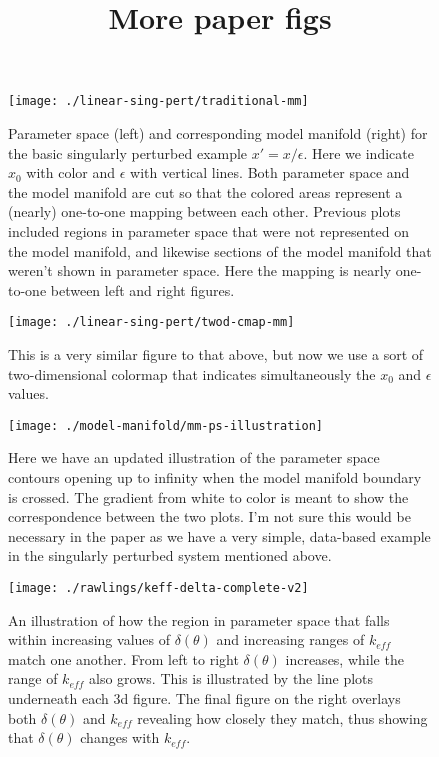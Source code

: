 \documentclass[11pt]{article}
\title{More paper figs}
\author{}
\begin{document}
\maketitle

\begin{figure}[htbp]
  \centering
  \texttt{[image: ./linear-sing-pert/traditional-mm]}
  \caption{Parameter space (left) and corresponding model manifold
    (right) for the basic singularly perturbed example $x' =
    x/\epsilon$. Here we indicate $x_0$ with color and $\epsilon$ with
  vertical lines. Both parameter space and the model manifold are cut
  so that the colored areas represent a (nearly) one-to-one mapping
  between each other. Previous plots included regions in parameter
  space that were not represented on the model manifold, and likewise
  sections of the model manifold that weren't shown in parameter
  space. Here the mapping is nearly one-to-one between left
  and right figures.}
\end{figure}

\begin{figure}[htbp]
  \centering
  \texttt{[image: ./linear-sing-pert/twod-cmap-mm]}
  \caption{This is a very similar figure to that above, but now we use a sort of
  two-dimensional colormap that indicates simultaneously the $x_0$ and
  $\epsilon$ values.}
\end{figure}

\begin{figure}[htbp]
  \centering
  \texttt{[image: ./model-manifold/mm-ps-illustration]}
  \caption{Here we have an updated illustration of the parameter space
    contours opening up to infinity when the model manifold boundary
    is crossed. The gradient from white to color is meant to show the
    correspondence between the two plots. I'm not sure this would be
    necessary in the paper as we have a very simple, data-based
    example in the singularly perturbed system mentioned above.}
\end{figure}


\begin{landscape}
  
  \begin{figure}[htbp]
    \centering
    \texttt{[image: ./rawlings/keff-delta-complete-v2]}
    \caption{An illustration of how the region in parameter space that
    falls within increasing values of $\delta(\theta)$ and increasing
    ranges of $k_{eff}$ match one another. From left to right
    $\delta(\theta)$ increases, while the range of $k_{eff}$ also
    grows. This is illustrated by the line plots underneath each 3d
    figure. The final figure on the right overlays both
    $\delta(\theta)$ and $k_{eff}$ revealing how closely they match,
    thus showing that $\delta(\theta)$ changes with $k_{eff}$.}
  \end{figure}
  

\end{landscape}
\end{document}
